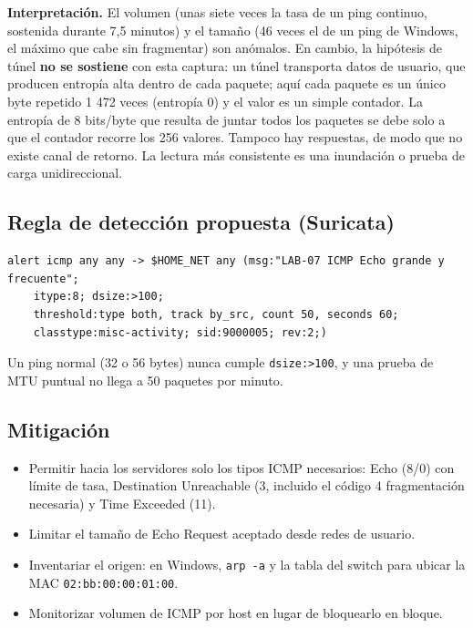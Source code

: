 \textbf{Interpretación.} El volumen (unas siete veces la tasa de un ping continuo, sostenida durante 7,5 minutos) y el tamaño (46 veces el de un ping de Windows, el máximo que cabe sin fragmentar) son anómalos. En cambio, la hipótesis de túnel \textbf{no se sostiene} con esta captura: un túnel transporta datos de usuario, que producen entropía alta dentro de cada paquete; aquí cada paquete es un único byte repetido 1 472 veces (entropía 0) y el valor es un simple contador. La entropía de 8 bits/byte que resulta de juntar todos los paquetes se debe solo a que el contador recorre los 256 valores. Tampoco hay respuestas, de modo que no existe canal de retorno. La lectura más consistente es una inundación o prueba de carga unidireccional.

\subsection{Regla de detección propuesta (Suricata)}

\begin{lstlisting}
alert icmp any any -> $HOME_NET any (msg:"LAB-07 ICMP Echo grande y frecuente";
    itype:8; dsize:>100;
    threshold:type both, track by_src, count 50, seconds 60;
    classtype:misc-activity; sid:9000005; rev:2;)
\end{lstlisting}

Un ping normal (32 o 56 bytes) nunca cumple \texttt{dsize:>100}, y una prueba de MTU puntual no llega a 50 paquetes por minuto.

\subsection{Mitigación}

\begin{itemize}
  \item Permitir hacia los servidores solo los tipos ICMP necesarios: Echo (8/0) con límite de tasa, Destination Unreachable (3, incluido el código 4 \guillemotleft{}fragmentación necesaria\guillemotright{}) y Time Exceeded (11).
  \item Limitar el tamaño de Echo Request aceptado desde redes de usuario.
  \item Inventariar el origen: en Windows, \texttt{arp -a} y la tabla del switch para ubicar la MAC \texttt{02:bb:00:00:01:00}.
  \item Monitorizar volumen de ICMP por host en lugar de bloquearlo en bloque.
\end{itemize}

